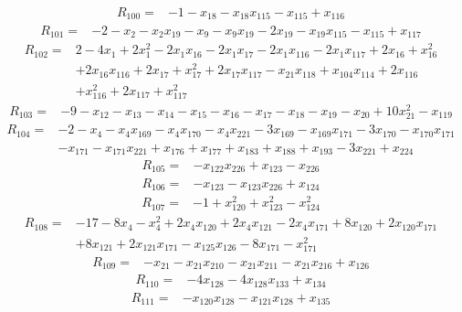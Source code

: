 \[\begin{aligned}R_{100}={}&-1-x_{18}-x_{18}x_{115}-x_{115}+x_{116}
\end{aligned}\]
\[\begin{aligned}R_{101}={}&-2-x_{2}-x_{2}x_{19}-x_{9}-x_{9}x_{19}-2x_{19}-x_{19}x_{115}-x_{115}+x_{117}
\end{aligned}\]
\[\begin{aligned}R_{102}={}&2-4x_{1}+2x_{1}^{2}-2x_{1}x_{16}-2x_{1}x_{17}-2x_{1}x_{116}-2x_{1}x_{117}+2x_{16}+x_{16}^{2}
\\&+2x_{16}x_{116}+2x_{17}+x_{17}^{2}+2x_{17}x_{117}-x_{21}x_{118}+x_{104}x_{114}+2x_{116}
\\&+x_{116}^{2}+2x_{117}+x_{117}^{2}
\end{aligned}\]
\[\begin{aligned}R_{103}={}&-9-x_{12}-x_{13}-x_{14}-x_{15}-x_{16}-x_{17}-x_{18}-x_{19}-x_{20}+10x_{21}^{2}-x_{119}
\end{aligned}\]
\[\begin{aligned}R_{104}={}&-2-x_{4}-x_{4}x_{169}-x_{4}x_{170}-x_{4}x_{221}-3x_{169}-x_{169}x_{171}-3x_{170}-x_{170}x_{171}
\\&-x_{171}-x_{171}x_{221}+x_{176}+x_{177}+x_{183}+x_{188}+x_{193}-3x_{221}+x_{224}
\end{aligned}\]
\[\begin{aligned}R_{105}={}&-x_{122}x_{226}+x_{123}-x_{226}
\end{aligned}\]
\[\begin{aligned}R_{106}={}&-x_{123}-x_{123}x_{226}+x_{124}
\end{aligned}\]
\[\begin{aligned}R_{107}={}&-1+x_{120}^{2}+x_{123}^{2}-x_{124}^{2}
\end{aligned}\]
\[\begin{aligned}R_{108}={}&-17-8x_{4}-x_{4}^{2}+2x_{4}x_{120}+2x_{4}x_{121}-2x_{4}x_{171}+8x_{120}+2x_{120}x_{171}
\\&+8x_{121}+2x_{121}x_{171}-x_{125}x_{126}-8x_{171}-x_{171}^{2}
\end{aligned}\]
\[\begin{aligned}R_{109}={}&-x_{21}-x_{21}x_{210}-x_{21}x_{211}-x_{21}x_{216}+x_{126}
\end{aligned}\]
\[\begin{aligned}R_{110}={}&-4x_{128}-4x_{128}x_{133}+x_{134}
\end{aligned}\]
\[\begin{aligned}R_{111}={}&-x_{120}x_{128}-x_{121}x_{128}+x_{135}
\end{aligned}\]

